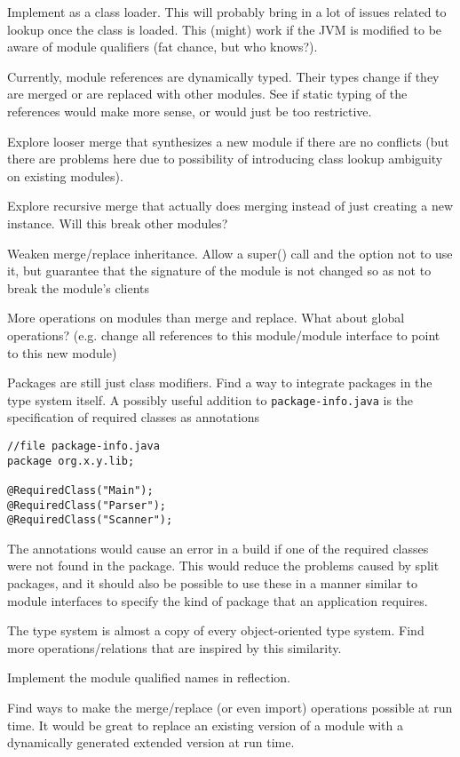 Implement as a class loader. This will probably bring in a lot of issues related to
lookup once the class is loaded. This (might) work if the JVM is modified to
be aware of module qualifiers (fat chance, but who knows?).

Currently, module references are dynamically typed. Their types change if they
are merged or are replaced with other modules. See if static typing of the 
references would make more sense, or would just be too restrictive.

Explore looser merge that synthesizes a new module if there are no conflicts
(but there are problems here due to possibility of introducing class lookup ambiguity
on existing modules).

Explore recursive merge that actually does merging instead of just creating a
new instance. Will this break other modules?

Weaken merge/replace inheritance. Allow a super() call and the option not to use it, 
but guarantee that the signature of the module is not changed so as not to break
the module's clients

More operations on modules than merge and replace. What about global operations? (e.g.
change all references to this module/module interface to point to this new module)

Packages are still just class modifiers. Find a way to integrate packages in the type
system itself. A possibly useful addition to \texttt{package-info.java} is the specification
of required classes as annotations

\begin{lstlisting}
//file package-info.java
package org.x.y.lib;

@RequiredClass("Main");
@RequiredClass("Parser");
@RequiredClass("Scanner");
\end{lstlisting}

The annotations would cause an error in a build if one of the required classes were not
found in the package. This would reduce the problems caused by split packages, and it should
also be possible to use these in a manner similar to module interfaces to specify the kind
of package that an application requires.

The type system is almost a copy of every object-oriented type system. Find more
operations/relations that are inspired by this similarity.

Implement the module qualified names in reflection.

Find ways to make the merge/replace (or even import) operations possible at run time.
It would be great to replace an existing version of a module with a dynamically generated
extended version at run time.